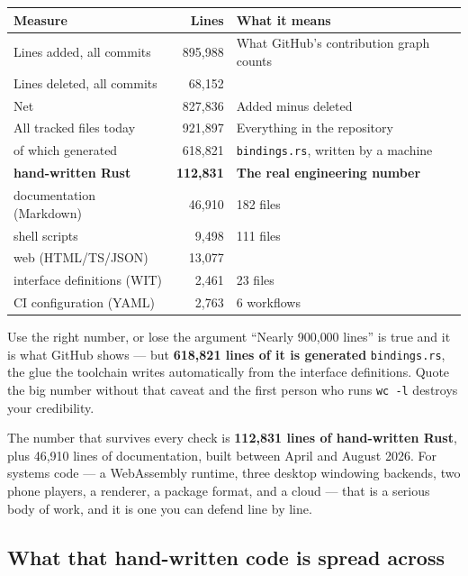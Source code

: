 \documentclass[11pt,a4paper]{report}
\begin{document}
\begin{center}
\begin{tabular}{lrp{6.2cm}}
\toprule
\textbf{Measure} & \textbf{Lines} & \textbf{What it means} \\
\midrule
Lines added, all commits & 895{,}988 & What GitHub's contribution graph counts \\
Lines deleted, all commits & 68{,}152 & \\
Net & 827{,}836 & Added minus deleted \\
\midrule
All tracked files today & 921{,}897 & Everything in the repository \\
\quad of which generated & 618{,}821 & \texttt{bindings.rs}, written by a machine \\
\quad \textbf{hand-written Rust} & \textbf{112{,}831} & \textbf{The real engineering number} \\
\quad documentation (Markdown) & 46{,}910 & 182 files \\
\quad shell scripts & 9{,}498 & 111 files \\
\quad web (HTML/TS/JSON) & 13{,}077 & \\
\quad interface definitions (WIT) & 2{,}461 & 23 files \\
\quad CI configuration (YAML) & 2{,}763 & 6 workflows \\
\bottomrule
\end{tabular}
\end{center}

\begin{warnbox}{Use the right number, or lose the argument}
``Nearly 900{,}000 lines'' is true and it is what GitHub shows --- but
\textbf{618{,}821 lines of it is generated} \texttt{bindings.rs}, the glue
the toolchain writes automatically from the interface definitions. Quote the
big number without that caveat and the first person who runs
\texttt{wc -l} destroys your credibility.

The number that survives every check is \textbf{112{,}831 lines of
hand-written Rust}, plus 46{,}910 lines of documentation, built between
April and August 2026. For systems code --- a WebAssembly runtime, three
desktop windowing backends, two phone players, a renderer, a package
format, and a cloud --- that is a serious body of work, and it is one you
can defend line by line.
\end{warnbox}

\subsection{What that hand-written code is spread across}
\end{document}
